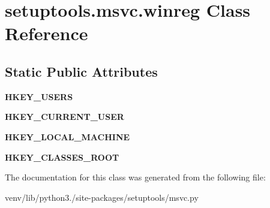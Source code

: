 \hypertarget{classsetuptools_1_1msvc_1_1winreg}{}\section{setuptools.\+msvc.\+winreg Class Reference}
\label{classsetuptools_1_1msvc_1_1winreg}
\subsection*{Static Public Attributes}
\begin{DoxyCompactItemize}
\item 
\mbox{\label{classsetuptools_1_1msvc_1_1winreg_a4589470fcc8687a720dbbeffcb07e2d6}} 
{\bfseries H\+K\+E\+Y\+\_\+\+U\+S\+E\+RS}
\item 
\mbox{\label{classsetuptools_1_1msvc_1_1winreg_a873136afb15608b6a5e8d0851167d65e}} 
{\bfseries H\+K\+E\+Y\+\_\+\+C\+U\+R\+R\+E\+N\+T\+\_\+\+U\+S\+ER}
\item 
\mbox{\label{classsetuptools_1_1msvc_1_1winreg_a656edb234e98d04b5eb57233f70a78a2}} 
{\bfseries H\+K\+E\+Y\+\_\+\+L\+O\+C\+A\+L\+\_\+\+M\+A\+C\+H\+I\+NE}
\item 
\mbox{\label{classsetuptools_1_1msvc_1_1winreg_a394ca1161b4e6dc25fe50329c6053b60}} 
{\bfseries H\+K\+E\+Y\+\_\+\+C\+L\+A\+S\+S\+E\+S\+\_\+\+R\+O\+OT}
\end{DoxyCompactItemize}


The documentation for this class was generated from the following file\+:\begin{DoxyCompactItemize}
\item 
venv/lib/python3./site-\/packages/setuptools/msvc.\+py\end{DoxyCompactItemize}
